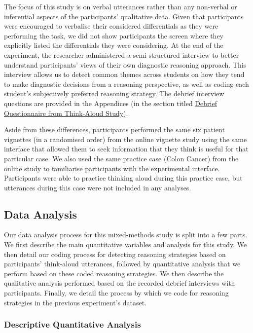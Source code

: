 \documentclass[a4paper, nobind]{templates/ociamthesis}
\begin{document}
\hfill\break
The focus of this study is on verbal utterances rather than any non-verbal or inferential aspects of the participants' qualitative data. Given that participants were encouraged to verbalise their considered differentials as they were performing the task, we did not show participants the screen where they explicitly listed the differentials they were considering. At the end of the experiment, the researcher administered a semi-structured interview to better understand participants' views of their own diagnostic reasoning approach. This interview allows us to detect common themes across students on how they tend to make diagnostic decisions from a reasoning perspective, as well as coding each student's subjectively preferred reasoning strategy. The debrief interview questions are provided in the Appendices (in the section titled \hyperref[debriefqs]{Debrief Questionnaire from Think-Aloud Study}).

\hfill\break
Aside from these differences, participants performed the same six patient vignettes (in a randomised order) from the online vignette study using the same interface that allowed them to seek information that they think is useful for that particular case. We also used the same practice case (Colon Cancer) from the online study to familiarise participants with the experimental interface. Participants were able to practice thinking aloud during this practice case, but utterances during this case were not included in any analyses.

\subsection{Data Analysis}\label{data-analysis-1}

Our data analysis process for this mixed-methods study is split into a few parts. We first describe the main quantitative variables and analysis for this study. We then detail our coding process for detecting reasoning strategies based on participants' think-aloud utterances, followed by quantitative analysis that we perform based on these coded reasoning strategies. We then describe the qualitative analysis performed based on the recorded debrief interviews with participants. Finally, we detail the process by which we code for reasoning strategies in the previous experiment's dataset.

\subsubsection{Descriptive Quantitative Analysis}\label{descriptive-quantitative-analysis}
\end{document}
